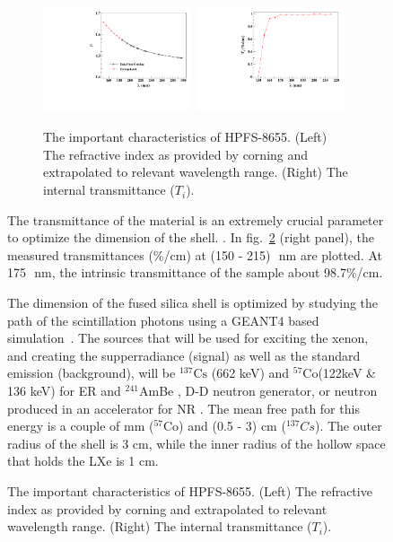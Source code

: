 \begin{figure}[h]
\begin{figure}[h]
   \centering
   \includegraphics[width=0.48\textwidth]{RI-calibration.pdf}
    \includegraphics[width=0.48\textwidth]{IntTransmittance.pdf}
   \caption{The important characteristics of HPFS-8655. (Left) The refractive index as provided by corning and 
   extrapolated to relevant wavelength range. (Right) The internal transmittance ($T_{i}$).} 
   \label{fig:hpfsRIcalibration}
\end{figure}

The transmittance of the material is an extremely crucial parameter to optimize the 
dimension of the shell. . 
In fig.~\ref{fig:hpfsRIcalibration} (right panel), the measured 
transmittances (\%/cm) at (150 - 215)~\,nm are plotted. At 175~\,nm, the intrinsic transmittance 
of the sample about 98.7\%/cm.  


The dimension of the fused silica shell is optimized by studying the path of the 
scintillation photons using a GEANT4 based simulation~\cite{Agostinelli:2002hh}. 
The sources that will be used for exciting the xenon, and creating the supperradiance 
(signal) as well as the standard emission (background), will be $^{137} \mathrm{Cs}$ 
(662 keV) and $^{57} \mathrm{Co}$(122keV \& 136 keV) for ER and $^{241}$AmBe , 
D-D neutron generator, or neutron produced in an accelerator for NR . The mean 
free path for this energy is a couple of mm ($^{57} \mathrm{Co}$) and (0.5 - 3) 
cm ($^{137} Cs$).  The outer radius of the shell is 3 cm, while the inner radius of the 
hollow space that holds the LXe is 1 cm. 



\end{figure}
